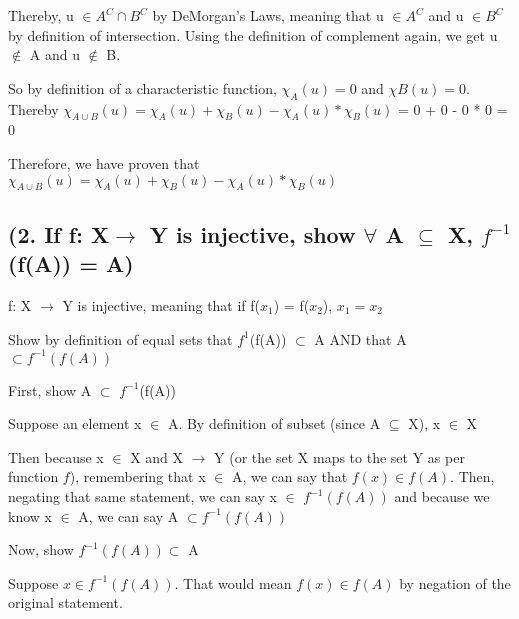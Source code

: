 \documentclass{article}
\begin{document}
\noindent Thereby, u $\in A^{C} \cap B^{C}$ by DeMorgan's Laws, meaning that u $\in A^{C}$ and u $\in B^{C}$ by definition of intersection.  Using the definition of complement again, we get u $\notin$ A and u $\notin$ B. \par\vspace{0.5cm}

\noindent So by definition of a characteristic function, $\chi_{A}(u) = 0$ and $\chi{B}(u) = 0$.  Thereby $\chi_{A\cup B}(u) = \chi_{A}(u) + \chi_{B}(u) - \chi_{A}(u) * \chi_{B}(u)$ = 0 + 0 - 0 * 0 = 0 \par\vspace{0.5cm}

\noindent Therefore, we have proven that $\chi_{A\cup B}(u) = \chi_{A}(u) + \chi_{B}(u) - \chi_{A}(u) * \chi_{B}(u)$

\subsection{(2. If f: X$\rightarrow$ Y is injective, show $\forall$ A $\subseteq$ X, $f^{-1}$(f(A)) = A)}
f: X $\rightarrow$ Y is injective, meaning that if f($x_{1}$) = f($x_{2}$), $x_{1} = x_{2}$ \par\vspace{0.5cm}

\noindent Show by definition of equal sets that $f^{1}$(f(A)) $\subset$ A AND that A $\subset f^{-1}(f(A))$ \par\vspace{0.5cm}

\noindent First, show A $\subset$ $f^{-1}$(f(A))  \par\vspace{0.5cm}

\noindent Suppose an element x $\in$ A.  By definition of subset (since A $\subseteq$ X), x $\in$ X \par\vspace{0.5cm}

\noindent Then because x $\in$ X and X $\rightarrow$ Y (or the set X maps to the set Y as per function $f$), remembering that x $\in$ A, we can say that $f(x) \in f(A)$.  Then, negating that same statement, we can say x $\in$ $f^{-1}(f(A))$ and because we know x $\in$ A, we can say A $\subset f^{-1}(f(A))$ \par\vspace{0.5cm}

\noindent Now, show $f^{-1}(f(A)) \subset$ A \par\vspace{0.5cm}
\noindent Suppose $x \in f^{-1}(f(A))$.  That would mean $f(x) \in f(A)$ by negation of the original statement. \par\vspace{0.5cm}
\end{document}
